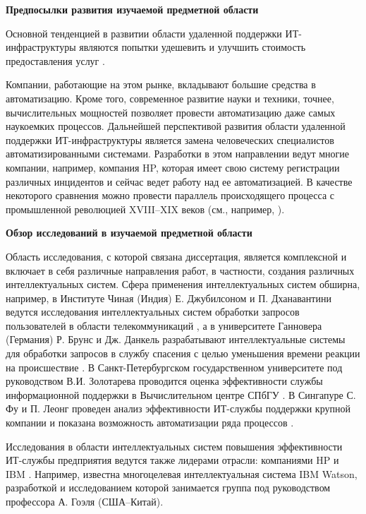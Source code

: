 \textbf{Предпосылки развития изучаемой предметной области}\par 
Основной тенденцией в развитии области удаленной поддержки ИТ-инфраструктуры являются попытки удешевить и улучшить стоимость предоставления услуг \cite{OutsourceEff}. \par
Компании, работающие на этом рынке, вкладывают большие средства в автоматизацию. Кроме того, современное развитие науки и техники, точнее, вычислительных мощностей \cite{SuperComputer} позволяет провести автоматизацию даже самых наукоемких процессов. Дальнейшей перспективой развития области удаленной поддержки ИТ-инфраструктуры является замена человеческих специалистов автоматизированными системами. Разработки в этом направлении ведут многие компании, например, компания HP, которая имеет свою систему регистрации различных инцидентов \cite{HPOpenView} и сейчас ведет работу над ее автоматизацией. В качестве некоторого сравнения можно провести параллель происходящего процесса с промышленной революцией XVIII–XIX веков (см., например, \cite{IndustrialRev}). \par
\textbf{Обзор исследований в изучаемой предметной области}\par Область исследования, с которой связана диссертация, является комплексной и включает в себя различные направления работ, в частности, создания различных интеллектуальных систем. Сфера применения интеллектуальных систем обширна, например, в Институте Чиная (Индия) Е. Джубилсоном и П. Дханавантини ведутся исследования интеллектуальных систем обработки запросов пользователей в области телекоммуникаций \cite{CHIN-1}, а в университете Ганновера (Германия) Р. Брунс и Дж. Данкель разрабатывают интеллектуальные системы для обработки запросов в службу спасения с целью уменьшения времени реакции на происшествие \cite{Dunkel}. В Санкт-Петербургском государственном университете под руководством В.И. Золотарева проводится оценка эффективности службы информационной поддержки в Вычислительном центре СПбГУ \cite{SPB}. В Сингапуре С. Фу и П. Леонг проведен анализ эффективности ИТ-службы поддержки крупной компании и показана возможность автоматизации ряда процессов \cite{SING}.\par
Исследования в области интеллектуальных систем повышения эффективности ИТ-службы предприятия ведутся также лидерами отрасли: компаниями HP \cite{HPOpenView} и IBM \cite{WATSON-PO}. Например, известна многоцелевая интеллектуальная система IBM Watson, разработкой и исследованием которой занимается группа под руководством профессора А. Гоэля (США--Китай).  \par   

